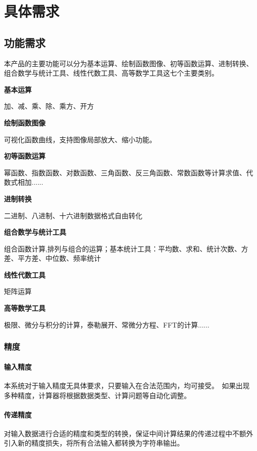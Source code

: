 \chapter{具体需求}

\section{功能需求}

本产品的主要功能可以分为基本运算、绘制函数图像、初等函数运算、进制转换、组合数学与统计工具、线性代数工具、高等数学工具这七个主要类别。

\textbf{基本运算}

	加、减、乘、除、乘方、开方

\textbf{绘制函数图像}

	可视化函数曲线，支持图像局部放大、缩小功能。

\textbf{初等函数运算}

	幂函数、指数函数、对数函数、三角函数、反三角函数、常数函数等计算求值、代数式相加......

\textbf{进制转换}

	二进制、八进制、十六进制数据格式自由转化

\textbf{组合数学与统计工具}

	组合函数计算,排列与组合的运算；基本统计工具：平均数、求和、统计次数、方差、平方差、中位数、频率统计

\textbf{线性代数工具}

	矩阵运算

\textbf{高等数学工具}

	极限、微分与积分的计算，泰勒展开、常微分方程、FFT的计算......

\subsection{精度}

\subsubsection{输入精度}

本系统对于输入精度无具体要求，只要输入在合法范围内，均可接受。\
如果出现多种精度，计算器将根据数据类型、计算问题等自动化调整。

\subsubsection{传递精度}

对输入数据进行合适的精度和类型的转换，保证中间计算结果的传递过程中不额外引入新的精度损失，将所有合法输入都转换为字符串输出。

